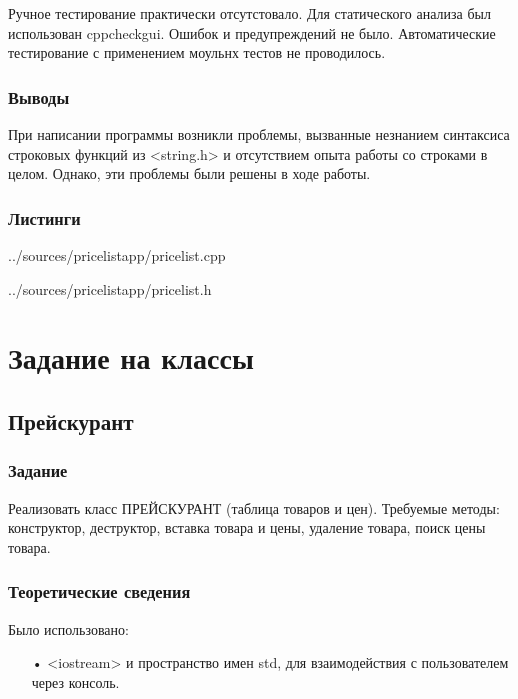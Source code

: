 \documentclass[12pt,a4paper]{report}
\begin{document}
Ручное тестирование практически отсутстовало.
Для статического анализа был использован cppcheckgui. Ошибок и предупреждений не было.
Автоматические тестирование с применением моульнх тестов не проводилось.


\subsection{Выводы}

При написании программы возникли проблемы, вызванные незнанием синтаксиса строковых функций из <string.h> и отсутствием опыта работы со строками в целом. Однако, эти проблемы были решены в ходе работы.

\subsection{Листинги}

{../sources/pricelistapp/pricelist.cpp}

{../sources/pricelistapp/pricelist.h}



\chapter{Задание на классы}

\section{Прейскурант}

\subsection{Задание}

Реализовать класс ПРЕЙСКУРАНТ (таблица товаров и цен). Требуемые методы: конструктор, деструктор, вставка товара и цены, удаление товара, поиск цены товара.

\subsection{Теоретические сведения}

Было использовано:
\begin{enumerate}
\item[•] <iostream> и пространство имен std, для взаимодействия с пользователем через консоль.
\end{enumerate}
\end{document}
